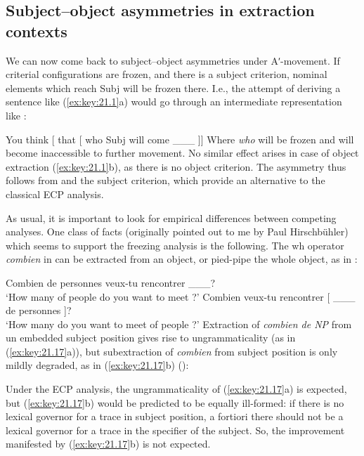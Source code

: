 \documentclass[output=paper]{langsci/langscibook}
\begin{document}
\begin{exe}
\section{Subject--object asymmetries in extraction contexts}

We can now come back to subject--object asymmetries under Aʹ-movement. If
criterial configurations are frozen, and there is a subject criterion, nominal
elements which reach Subj will be frozen there. I.e., the attempt of deriving a
sentence like (\ref{ex:key:21.1}a) would go through an intermediate
representation like :

\ea%
    \label{ex:key:21.15}
    You think [ that [ who Subj\tss{[+N]} will come \_\_\_ ]]
\z
%
Where \emph{who} will be frozen and will become inaccessible to further
movement. No similar effect arises in case of object extraction
(\ref{ex:key:21.1}b), as there is no object criterion. The asymmetry thus
follows from  and the subject criterion, which provide an
alternative to the classical \gls{ECP} analysis.

As usual, it is important to look for empirical differences between competing
analyses. One class of facts (originally pointed out to me by Paul
Hirschbühler) which seems to support the freezing analysis is the following.
The wh operator \emph{combien} in  can be extracted from an object,
or pied-pipe the whole object, as in :

\ea%
    \label{ex:key:21.16}
    \ea Combien de personnes veux-tu rencontrer \_\_\_?\\
        ‘How many of people do you want to meet ?’
    \ex Combien veux-tu rencontrer [ \_\_\_ de personnes ]?\\
        ‘How many do you want to meet of people ?’
    \z
\z
%
Extraction of \emph{combien de NP} from un embedded subject position gives rise
to ungrammaticality (as in (\ref{ex:key:21.17}a)), but subextraction of
\emph{combien} from subject position is only mildly degraded, as in
(\ref{ex:key:21.17}b) (\citealt{Obenauer1976,Kayne1984}):

\ea%
    \label{ex:key:21.17}
    \z
\z
%
Under the \gls{ECP} analysis, the ungrammaticality of (\ref{ex:key:21.17}a) is
expected, but (\ref{ex:key:21.17}b) would be predicted to be equally ill-formed:
if there is no lexical governor for a trace in subject position, a fortiori
there should not be a lexical governor for a trace in the specifier of the
subject. So, the improvement manifested by (\ref{ex:key:21.17}b) is not expected.


\end{exe}
\end{document}
